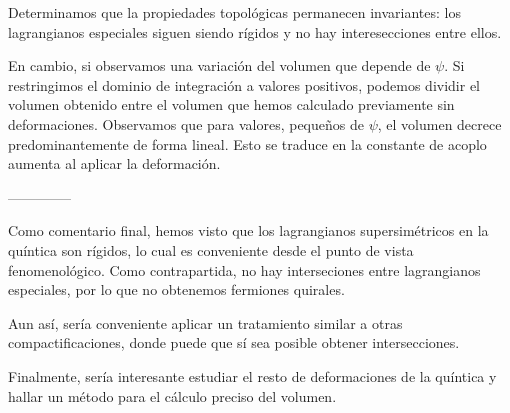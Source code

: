 \documentclass[oneside,secnumarabic,10pt,nobalancelastpage,nofootinbib,a4paper]{article}
\begin{document}
Determinamos que la propiedades topológicas permanecen invariantes: los lagrangianos especiales siguen siendo rígidos y no hay interesecciones
entre ellos.

En cambio, si observamos una variación del volumen que depende de $\psi$. 
Si restringimos el dominio de integración a valores positivos, podemos dividir el volumen obtenido entre el volumen que hemos calculado previamente
sin deformaciones.
Observamos que para valores, pequeños de $\psi$, el volumen decrece predominantemente de forma lineal.
Esto se traduce en la constante de acoplo aumenta al aplicar la deformación.

--------------

Como comentario final, hemos visto que los lagrangianos supersimétricos en la quíntica son rígidos,
lo cual es conveniente desde el punto de vista fenomenológico.
Como contrapartida, no hay interseciones entre lagrangianos especiales, por lo que no obtenemos fermiones
quirales.

Aun así, sería conveniente aplicar un tratamiento similar a otras compactificaciones, donde puede que sí sea posible
obtener intersecciones.

Finalmente, sería interesante estudiar el resto de deformaciones de la quíntica y hallar un método para el cálculo preciso del volumen.
\end{document}
